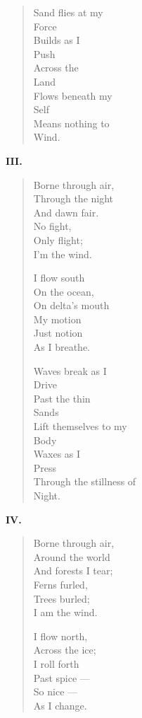 \begin{leftcolumn}
\begin{verse}
  Sand flies at my\\
  \vin \vin Force\\
  Builds as I\\
  \vin \vin Push\\
  Across the\\
  \vin \vin Land\\
  Flows beneath my\\
  \vin \vin Self\\
  Means nothing to\\
  \vin \vin Wind.
\end{verse}
\newpage

\textbf{III.}
\begin{verse}
  Borne through air,\\
  \vin Through the night\\
  And dawn fair.\\
  \vin No fight,\\
  \vin Only flight;\\
  I'm the wind.

  I flow south\\
  \vin On the ocean,\\
  On delta's mouth\\
  \vin My motion\\
  \vin Just notion\\
  As I breathe.

  Waves break as I\\
  \vin \vin Drive\\
  Past the thin\\
  \vin \vin Sands\\
  Lift themselves to my\\
  \vin \vin Body\\
  Waxes as I\\
  \vin \vin Press\\
  Through the stillness of\\
  \vin \vin Night.
\end{verse}
\newpage

\textbf{IV.}
\begin{verse}
  Borne through air,\\
  \vin Around the world\\
  And forests I tear;\\
  \vin Ferns furled,\\
  \vin Trees burled;\\
  I am the wind.

  I flow north,\\
  \vin Across the ice;\\
  I roll forth\\
  \vin Past spice ---\\
  \vin So nice ---\\
  As I change.


\end{verse}
\end{leftcolumn}
